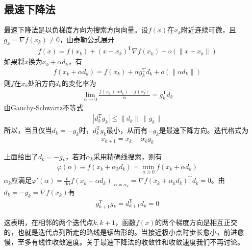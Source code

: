    \subsection{最速下降法}
        \par
        最速下降法是以负梯度方向为搜索方向向量。设$f(x)$在$x_k$附近连续可微，且$g_k= \nabla f(x_k) \ne 0$，由泰勒公式展开
        \begin{align*}
        f(x) = f(x_k)+(x-x_k)^\mathrm{T} \nabla f(x_k)+ o (\|x-x_k\|)
        \end{align*}
        如果将$x$换为$x_k+\alpha d_k$，有
        \begin{align*}
        f(x_k+\alpha d_k)=f(x_k)+ \alpha g_k^\mathrm{T} d_k+o (\|\alpha d_k\|)
        \end{align*}
        则$f$在$x_k$处沿方向$d_k$的变化率为
        \begin{align*}
        \mathop {\lim}\limits_{\alpha \to 0} \frac {f(x_k+\alpha d_k)-f(x_k)}{\alpha}=g_k^\mathrm{T}  d_k
        \end{align*}
        由Gauchy-Schwartz不等式
        \begin{align*}
        |d^\mathrm{T}_k g_k| \leqslant \|d_k\|\ \|g_k\|
        \end{align*}
        所以，当且仅当$d_k=-g_k$时，$d^\mathrm{T}_k g_k$最小，从而有$-g_k$是最速下降方向。迭代格式为
        \begin{align*}
        x_{k+1} = x_k-{\alpha}_k g_k
        \end{align*}
        \par
        上面给出了$d_k=-g_k$，若对${\alpha}_k$采用精确线搜索，则有
        \begin{align*}
        \varphi(\alpha) \equiv  f(x_k+{\alpha}_k d_k)=\mathop {\min} \limits_{\alpha \geqslant 0}f(x_k+{\alpha} d_k)
        \end{align*}
        ${\alpha}_k$应满足${\varphi}'(\alpha) = \frac{\mathrm{d}}{\mathrm{d}\alpha}f(x_k+{\alpha} d_k)\big|_{\alpha = {\alpha}_k}= \nabla f(x_k+{\alpha}_k d_k)^\mathrm{T} d_k = 0$。由$d_k=-g_k= \nabla f(x_k)$有
        \begin{align*}
        g_{k+1}^\mathrm{T} g_k = d_{k+1}^\mathrm{T} d_k=0
        \end{align*}
        \par
        这表明，在相邻的两个迭代点$k,k+1$，函数$f(x)$的两个梯度方向是相互正交的，也就是迭代点列所走的路线是锯齿形的。当接近极小点时步长愈小，前进愈慢，至多有线性收敛速度。关于最速下降法的收敛性和收敛速度我们不再讨论。

